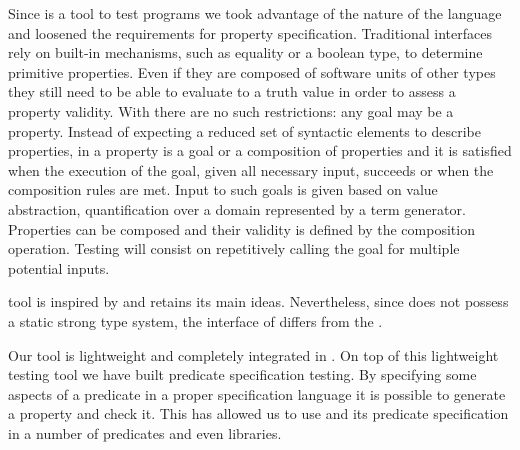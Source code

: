 Since \plqc{} is a tool to test \Prolog{} programs we took advantage of
the nature of the language and loosened the requirements for property
specification.
%
Traditional interfaces rely on built-in mechanisms, such as equality or
a boolean type, to determine primitive properties.
%
Even if they are composed of software units of other types they still
need to be able to evaluate to a truth value in order to assess a
property validity.
%
With \Prolog{} there are no such restrictions: any goal may be a property.
%
Instead of expecting a reduced set of syntactic elements to describe
properties, in \plqc{} a property is a goal or a composition of
properties and it is satisfied when the execution of the goal, given all
necessary input, succeeds or when the composition rules are met.
%
Input to such goals is given based on \plqc{} value abstraction,
quantification over a domain represented by a term generator.
%
Properties can be composed and their validity is defined by the
composition operation.
%
Testing will consist on repetitively calling the goal for multiple
potential inputs.


\plqc{} tool is inspired by \QuickCheck{} and retains its main
ideas.
%
%
Nevertheless, since \Prolog{} does not possess a static strong
type system, the interface of \plqc{} differs from the \Haskell{}
\QuickCheck{}.


Our tool is
lightweight and completely integrated in \Prolog{}.
%
On top of this lightweight testing tool we have built predicate
specification testing.
%
By specifying some aspects of a predicate in a proper specification
language it is possible to generate a \plqc{} property and check it.
%
This has allowed us to  use \plqc{} and its predicate specification in a number of
predicates and even libraries.







